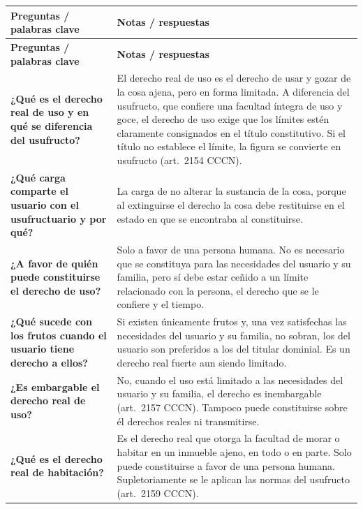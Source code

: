 \documentclass[12pt,oneside]{book}
\begin{document}
\begin{longtable}{
    >{\raggedright\arraybackslash}p{}
    >{\raggedright\arraybackslash}p{}
}
\toprule
\textbf{Preguntas / palabras clave} & \textbf{Notas / respuestas} \\
\midrule
\endfirsthead
\toprule
\textbf{Preguntas / palabras clave} & \textbf{Notas / respuestas} \\
\midrule
\endhead
\bottomrule
\endfoot

\textbf{¿Qué es el derecho real de uso y en qué se diferencia del usufructo?} &
El derecho real de uso es el derecho de usar y gozar de la cosa ajena, pero en forma limitada. A diferencia del usufructo, que confiere una facultad íntegra de uso y goce, el derecho de uso exige que los límites estén claramente consignados en el título constitutivo. Si el título no establece el límite, la figura se convierte en usufructo (art.~2154 CCCN). \\[0.8em]

\textbf{¿Qué carga comparte el usuario con el usufructuario y por qué?} &
La carga de no alterar la sustancia de la cosa, porque al extinguirse el derecho la cosa debe restituirse en el estado en que se encontraba al constituirse. \\[0.8em]

\textbf{¿A favor de quién puede constituirse el derecho de uso?} &
Solo a favor de una persona humana. No es necesario que se constituya para las necesidades del usuario y su familia, pero sí debe estar ceñido a un límite relacionado con la persona, el derecho que se le confiere y el tiempo. \\[0.8em]

\textbf{¿Qué sucede con los frutos cuando el usuario tiene derecho a ellos?} &
Si existen únicamente frutos y, una vez satisfechas las necesidades del usuario y su familia, no sobran, los del usuario son preferidos a los del titular dominial. Es un derecho real fuerte aun siendo limitado. \\[0.8em]

\textbf{¿Es embargable el derecho real de uso?} &
No, cuando el uso está limitado a las necesidades del usuario y su familia, el derecho es inembargable (art.~2157 CCCN). Tampoco puede constituirse sobre él derechos reales ni transmitirse. \\[0.8em]

\textbf{¿Qué es el derecho real de habitación?} &
Es el derecho real que otorga la facultad de morar o habitar en un inmueble ajeno, en todo o en parte. Solo puede constituirse a favor de una persona humana. Supletoriamente se le aplican las normas del usufructo (art.~2159 CCCN). \\[0.8em]


\end{longtable}
\end{document}

